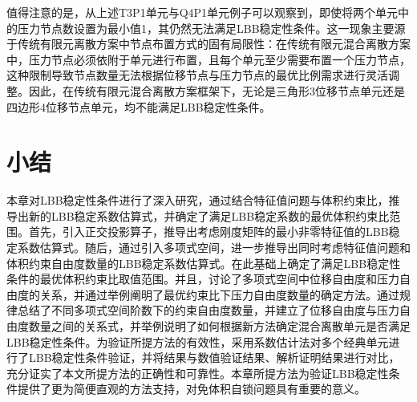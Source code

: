 值得注意的是，从上述T3P1单元与Q4P1单元例子可以观察到，即使将两个单元中的压力节点数设置为最小值1，其仍然无法满足LBB稳定性条件。这一现象主要源于传统有限元离散方案中节点布置方式的固有局限性：在传统有限元混合离散方案中，压力节点必须依附于单元进行布置，且每个单元至少需要布置一个压力节点，这种限制导致节点数量无法根据位移节点与压力节点的最优比例需求进行灵活调整。因此，在传统有限元混合离散方案框架下，无论是三角形3位移节点单元还是四边形4位移节点单元，均不能满足LBB稳定性条件。

\section{小结}
本章对LBB稳定性条件进行了深入研究，通过结合特征值问题与体积约束比，推导出新的LBB稳定系数估算式，并确定了满足LBB稳定系数的最优体积约束比范围。首先，引入正交投影算子，推导出考虑刚度矩阵的最小非零特征值的LBB稳定系数估算式。随后，通过引入多项式空间，进一步推导出同时考虑特征值问题和体积约束自由度数量的LBB稳定系数估算式。在此基础上确定了满足LBB稳定性条件的最优体积约束比取值范围。并且，讨论了多项式空间中位移自由度和压力自由度的关系，并通过举例阐明了最优约束比下压力自由度数量的确定方法。通过规律总结了不同多项式空间阶数下的约束自由度数量，并建立了位移自由度与压力自由度数量之间的关系式，并举例说明了如何根据新方法确定混合离散单元是否满足LBB稳定性条件。为验证所提方法的有效性，采用系数估计法对多个经典单元进行了LBB稳定性条件验证，并将结果与数值验证结果、解析证明结果进行对比，充分证实了本文所提方法的正确性和可靠性。本章所提方法为验证LBB稳定性条件提供了更为简便直观的方法支持，对免体积自锁问题具有重要的意义。